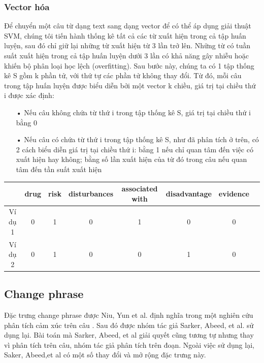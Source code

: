 \subsubsection*{Vector hóa}
Để chuyển một câu từ dạng text sang dạng vector để có thể áp dụng giải thuật SVM, chúng tôi tiến hành thống kê tất cả các từ xuất hiện trong cả tập huấn luyện, sau đó chỉ giữ lại những từ xuất hiện từ 3 lần trở lên. Những từ có tuần suất xuất hiện trong cả tập huấn luyện dưới 3 lần có khả năng gây nhiễu hoặc khiến bộ phân loại học lệch (overfitting). Sau bước này, chúng ta có 1 tập thống kê S gồm k phần tử, với thứ tự các phần tử không thay đổi. Từ đó, mỗi câu trong tập huấn luyện được biểu diễn bởi một vector k chiều, giá trị tại chiều thứ i được xác định:
\begin{itemize}[noitemsep]
\item[•] Nếu câu không chứa từ thứ i trong tập thống kê S, giá trị tại chiều thứ i bằng 0
\item[•] Nếu câu có chứa từ thứ i trong tập thống kê S, như đã phân tích ở trên, có 2 cách biểu diễn giá trị tại chiều thứ i: bằng 1 nếu chỉ quan tâm đến việc có xuất hiện hay không; bằng số lần xuất hiện của từ đó trong câu nếu quan tâm đến tần suất xuất hiện
\end{itemize}

\begin{tabular}{| c | c | c | c | c | c | c | c |}
\hline
  & \textbf{drug} & \textbf{risk} & \textbf{disturbances} & \textbf{associated with} & \textbf{disadvantage} & \textbf{evidence}
\\ \hline
Ví dụ 1 & 0 & 1 & 0 & 1 & 0 & 0
\\ \hline
Ví dụ 2 & 0 & 1 & 0 & 0 & 1 & 0
\\ \hline
\end{tabular}
\subsection{Change phrase}
Đặc trưng change phrase được Niu, Yun et al. định nghĩa trong một nghiên cứu phân tích cảm xúc trên câu \cite{niu2005analysis}. Sau đó được nhóm tác giả Sarker, Abeed, et al. sử dụng lại. Bài toán mà Sarker, Abeed, et al giải quyết cũng tương tự nhưng thay vì phân tích trên câu, nhóm tác giả phân tích trên đoạn. Ngoài việc sử dụng lại, Saker, Abeed,et al có một số thay đổi và mở rộng đặc trưng này.
